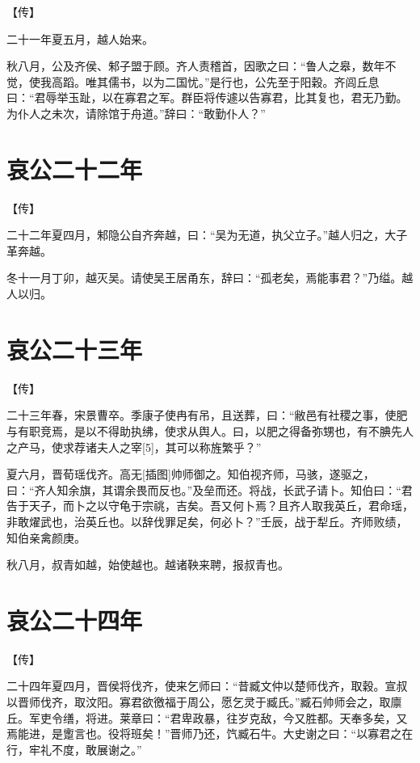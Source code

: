 \documentclass[a4paper,12pt,UTF8,twoside]{ctexbook}
\begin{document}
【传】

二十一年夏五月，越人始来。

秋八月，公及齐侯、邾子盟于顾。齐人责稽首，因歌之曰：“鲁人之皋，数年不觉，使我高蹈。唯其儒书，以为二国忧。”是行也，公先至于阳穀。齐闾丘息曰：“君辱举玉趾，以在寡君之军。群臣将传遽以告寡君，比其复也，君无乃勤。为仆人之未次，请除馆于舟道。”辞曰：“敢勤仆人？”



\chapter{哀公二十二年}



【传】

二十二年夏四月，邾隐公自齐奔越，曰：“吴为无道，执父立子。”越人归之，大子革奔越。

冬十一月丁卯，越灭吴。请使吴王居甬东，辞曰：“孤老矣，焉能事君？”乃缢。越人以归。



\chapter{哀公二十三年}



【传】

二十三年春，宋景曹卒。季康子使冉有吊，且送葬，曰：“敝邑有社稷之事，使肥与有职竞焉，是以不得助执绋，使求从舆人。曰，以肥之得备弥甥也，有不腆先人之产马，使求荐诸夫人之宰[5]，其可以称旌繁乎？”

夏六月，晋荀瑶伐齐。高无[插图]帅师御之。知伯视齐师，马骇，遂驱之，曰：“齐人知余旗，其谓余畏而反也。”及垒而还。将战，长武子请卜。知伯曰：“君告于天子，而卜之以守龟于宗祧，吉矣。吾又何卜焉？且齐人取我英丘，君命瑶，非敢燿武也，治英丘也。以辞伐罪足矣，何必卜？”壬辰，战于犁丘。齐师败绩，知伯亲禽颜庚。

秋八月，叔青如越，始使越也。越诸鞅来聘，报叔青也。



\chapter{哀公二十四年}


【传】

二十四年夏四月，晋侯将伐齐，使来乞师曰：“昔臧文仲以楚师伐齐，取穀。宣叔以晋师伐齐，取汶阳。寡君欲徼福于周公，愿乞灵于臧氏。”臧石帅师会之，取廪丘。军吏令缮，将进。莱章曰：“君卑政暴，往岁克敌，今又胜都。天奉多矣，又焉能进，是躗言也。役将班矣！”晋师乃还，饩臧石牛。大史谢之曰：“以寡君之在行，牢礼不度，敢展谢之。”
\end{document}
